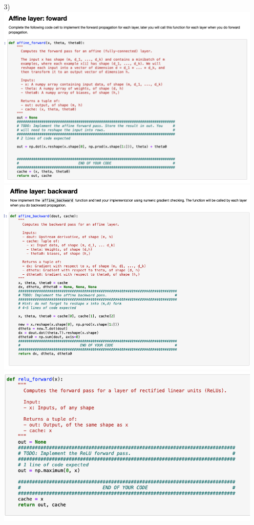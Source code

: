 \documentclass[11pt]{article}
\begin{document}
3) \\
\includegraphics[scale= 0.35]{hw8-1} \\
\includegraphics[scale= 0.35]{hw8-2} \\
\includegraphics[scale= 0.35]{hw8-3} \\
\end{document}
